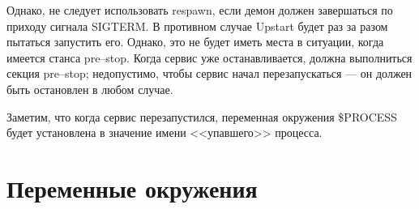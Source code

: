 Однако, не следует использовать respawn, если демон должен завершаться по приходу сигнала SIGTERM. В противном случае Upstart будет раз за разом пытаться запустить его. Однако, это не будет иметь места в ситуации, когда имеется станса pre--stop. Когда сервис уже останавливается, должна выполниться секция pre--stop; недопустимо, чтобы сервис начал перезапускаться --- он должен быть остановлен в любом случае.

Заметим, что когда сервис перезапустился, переменная окружения \$PROCESS будет установлена в значение имени <<упавшего>> процесса.
\section{Переменные окружения} \label{sec:EnviromentVariables}